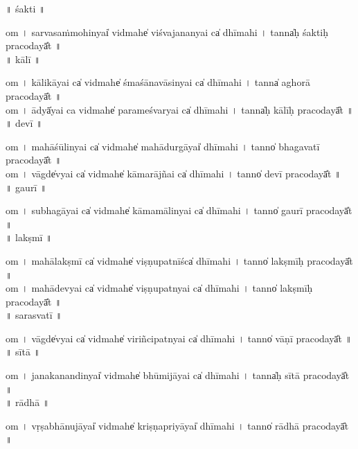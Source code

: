 \documentclass[parskip, DIV=14]{scrartcl}
\begin{document}
\vspace{0.201cm} ॥   śakti  ॥ \par
  om  । sa॒rva॒sa॒ṁmo॒hinyai̍ vi॒dmahe̍ viśvajana॒nyai ca̍ dhīmahi  ।  tanna̍ḥ śaktiḥ praco॒dayā̎t ॥ \\

\vspace{0.201cm} ॥   kālī  ॥ \par
  om  । kā॒li॒kā॒yai ca̍ vi॒dmahe̍ śmaśānavāsi॒nyai ca̍ dhīmahi  ।  tanna̍ aghorā praco॒dayā̎t ॥ \\
  om  । ādyā̍yai ca vi॒dmahe̍ parameśvaryai ca̍ dhīmahi  ।  tanna̍ḥ kālīḥ praco॒dayā̎t ॥ \\

\vspace{0.201cm} ॥   devī  ॥ \par
  om  । ma॒hā॒śū॒li॒nyai ca̍ vi॒dmahe̍ mahādu॒rgāyai̍ dhīmahi  ।  tanno̍ bhagavatī praco॒dayā̎t ॥ \\
  om  । vāgde̍vyai ca̍ vi॒dmahe̍ kāmarā॒jñai ca̍ dhīmahi  ।  tanno̍ devī praco॒dayā̎t ॥ \\

\vspace{0.201cm} ॥   gaurī  ॥ \par
  om  । su॒bha॒gā॒yai ca̍ vi॒dmahe̍ kāmamāli॒nyai ca̍ dhīmahi  ।  tanno̍ gaurī praco॒dayā̎t ॥ \\

\vspace{0.201cm} ॥   lakṣmī  ॥ \par
  om  । ma॒hā॒la॒kṣmī ca̍ vi॒dmahe̍ viṣṇupa॒tnīśca̍ dhīmahi  ।  tanno̍ lakṣmīḥ praco॒dayā̎t ॥ \\
  om  । ma॒hā॒de॒vyai ca̍ vi॒dmahe̍ viṣṇupa॒tnyai ca̍ dhīmahi   ।  tanno̍ lakṣmīḥ praco॒dayā̎t ॥ \\

\vspace{0.201cm} ॥   sarasvatī  ॥ \par
  om  । vāgde̍vyai ca̍ vi॒dmahe̍ viriñcipa॒tnyai ca̍ dhīmahi  ।  tanno̍ vāṇī praco॒dayā̎t ॥ \\

\vspace{0.201cm} ॥   sītā  ॥ \par
  om  । ja॒na॒ka॒na॒ndinyai̍ vi॒dmahe̍ bhūmijā॒yai ca̍ dhīmahi  ।  tanna̍ḥ sītā praco॒dayā̎t ॥ \\

\vspace{0.201cm} ॥   rādhā  ॥ \par
  om  । vṛ॒ṣa॒bhā॒nu॒jāyai̍ vi॒dmahe̍ kriṣṇapri॒yāyai̍ dhīmahi  ।  tanno̍ rādhā praco॒dayā̎t ॥ \\
\end{document}
